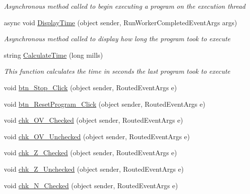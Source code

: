 \begin{DoxyCompactItemize}
\begin{DoxyCompactList}\small\item\em Asynchronous method called to begin executing a program on the execution thread \end{DoxyCompactList}\item 
async void \hyperlink{class_c_p_u___o_s___simulator_1_1_main_window_aa45870d58297e47b7a6dbc45046c264e}{Display\+Time} (object sender, Run\+Worker\+Completed\+Event\+Args args)
\begin{DoxyCompactList}\small\item\em Asynchronous method called to display how long the program took to execute \end{DoxyCompactList}\item 
string \hyperlink{class_c_p_u___o_s___simulator_1_1_main_window_af436535e8368accea735ff7672fa83d9}{Calculate\+Time} (long mills)
\begin{DoxyCompactList}\small\item\em This function calculates the time in seconds the last program took to execute \end{DoxyCompactList}\item 
void \hyperlink{class_c_p_u___o_s___simulator_1_1_main_window_acbdc92abd94c317f978cee0d28af9448}{btn\+\_\+\+Stop\+\_\+\+Click} (object sender, Routed\+Event\+Args e)
\item 
void \hyperlink{class_c_p_u___o_s___simulator_1_1_main_window_a524b638c053cd53f17e44fe225b9dd4f}{btn\+\_\+\+Reset\+Program\+\_\+\+Click} (object sender, Routed\+Event\+Args e)
\item 
void \hyperlink{class_c_p_u___o_s___simulator_1_1_main_window_a19b793a858804e5f7a5611603aeeaf79}{chk\+\_\+\+O\+V\+\_\+\+Checked} (object sender, Routed\+Event\+Args e)
\item 
void \hyperlink{class_c_p_u___o_s___simulator_1_1_main_window_a59f718f48699e2f35c0151057407c38c}{chk\+\_\+\+O\+V\+\_\+\+Unchecked} (object sender, Routed\+Event\+Args e)
\item 
void \hyperlink{class_c_p_u___o_s___simulator_1_1_main_window_ae6186ab1f27e668a1332b7cf72c70f19}{chk\+\_\+\+Z\+\_\+\+Checked} (object sender, Routed\+Event\+Args e)
\item 
void \hyperlink{class_c_p_u___o_s___simulator_1_1_main_window_a21d19250773a14a89aa8285dbe914c22}{chk\+\_\+\+Z\+\_\+\+Unchecked} (object sender, Routed\+Event\+Args e)
\item 
void \hyperlink{class_c_p_u___o_s___simulator_1_1_main_window_a0d0fff66a2f20f19e86f7d8d25aa8915}{chk\+\_\+\+N\+\_\+\+Checked} (object sender, Routed\+Event\+Args e)

\end{DoxyCompactItemize}
